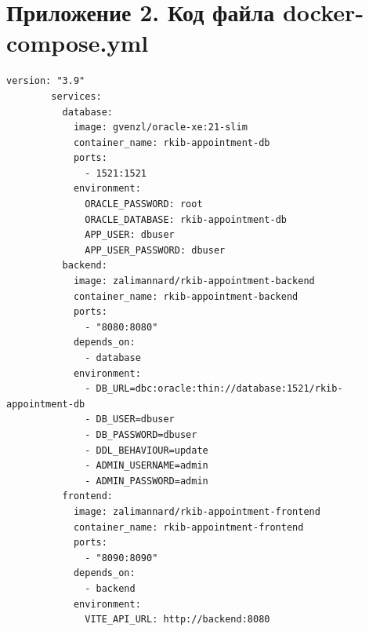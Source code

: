 \documentclass[a4paper,article]{article}
\begin{document}
\begin{sloppypar}
\begin{appendices}
\begin{xltabular}{\textwidth} { |
                >{\hsize} X |
                >{\hsize} X | }
            \hline
        \end{xltabular}
        
        \newpage
        
        \section*{Приложение 2. Код файла docker-compose.yml}\label{dockercomposeyml}
        \setcounter{section}{2}
        \begin{lstlisting}[]
        version: "3.9"
        services:
          database:
            image: gvenzl/oracle-xe:21-slim
            container_name: rkib-appointment-db
            ports:
              - 1521:1521
            environment:
              ORACLE_PASSWORD: root
              ORACLE_DATABASE: rkib-appointment-db
              APP_USER: dbuser
              APP_USER_PASSWORD: dbuser
          backend:
            image: zalimannard/rkib-appointment-backend
            container_name: rkib-appointment-backend
            ports:
              - "8080:8080"
            depends_on:
              - database
            environment:
              - DB_URL=dbc:oracle:thin://database:1521/rkib-appointment-db
              - DB_USER=dbuser
              - DB_PASSWORD=dbuser
              - DDL_BEHAVIOUR=update
              - ADMIN_USERNAME=admin
              - ADMIN_PASSWORD=admin
          frontend:
            image: zalimannard/rkib-appointment-frontend
            container_name: rkib-appointment-frontend
            ports:
              - "8090:8090"
            depends_on:
              - backend
            environment:
              VITE_API_URL: http://backend:8080
        \end{lstlisting}
    \end{appendices}

\end{sloppypar}
\end{document}
